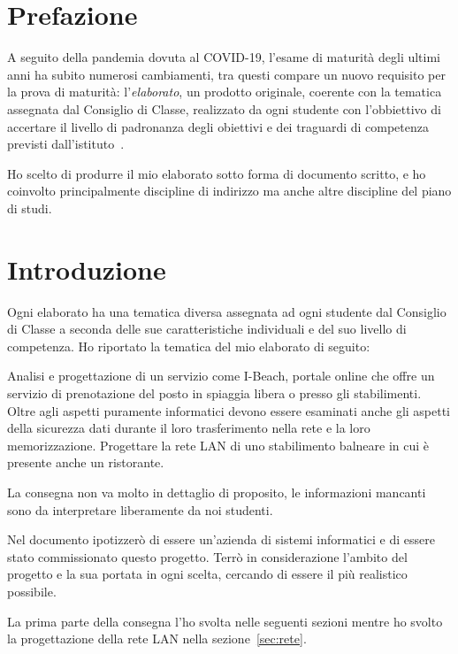 \section*{Prefazione}
A seguito della pandemia dovuta al COVID-19, l'esame di maturit\`a degli ultimi anni ha subito numerosi cambiamenti, tra questi compare un nuovo requisito per la prova di maturit\`a: l'\emph{elaborato}, un prodotto originale, coerente con la tematica assegnata dal Consiglio di Classe, realizzato da ogni studente con l'obbiettivo di accertare il livello di padronanza degli obiettivi e dei traguardi di competenza previsti dall'istituto~\cite{elaborato-intro}.

Ho scelto di produrre il mio elaborato sotto forma di documento scritto, e ho coinvolto principalmente discipline di indirizzo ma anche altre discipline del piano di studi.

\section{Introduzione}
Ogni elaborato ha una tematica diversa assegnata ad ogni studente dal Consiglio di Classe a seconda delle sue caratteristiche individuali e del suo livello di competenza. Ho riportato la tematica del mio elaborato di seguito:

\begin{center}
    \begin{minipage}{0.8\linewidth}
        Analisi e progettazione di un servizio come I-Beach, portale online che offre un
        servizio di prenotazione del posto in spiaggia libera o presso gli stabilimenti.
        Oltre agli aspetti puramente informatici devono essere esaminati anche gli aspetti
        della sicurezza dati durante il loro trasferimento nella rete e la loro
        memorizzazione. Progettare la rete LAN di uno stabilimento balneare in cui è presente
        anche un ristorante. 
    \end{minipage}
\end{center}

La consegna non va molto in dettaglio di proposito, le informazioni mancanti sono da interpretare liberamente da noi studenti.

Nel documento ipotizzer\`o di essere un'azienda di sistemi informatici e di essere stato commissionato questo progetto. Terr\`o in considerazione l'ambito del progetto e la sua portata in ogni scelta, cercando di essere il pi\`u realistico possibile.

La prima parte della consegna l'ho svolta nelle seguenti sezioni mentre ho svolto la progettazione della rete LAN nella sezione~\ref{sec:rete}.